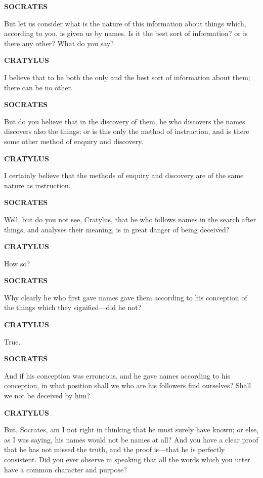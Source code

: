 \documentclass[11pt,letter]{article}
\begin{document}
\par \textbf{SOCRATES}
\par   But let us consider what is the nature of this information about things which, according to you, is given us by names. Is it the best sort of information? or is there any other? What do you say?

\par \textbf{CRATYLUS}
\par   I believe that to be both the only and the best sort of information about them; there can be no other.

\par \textbf{SOCRATES}
\par   But do you believe that in the discovery of them, he who discovers the names discovers also the things; or is this only the method of instruction, and is there some other method of enquiry and discovery.

\par \textbf{CRATYLUS}
\par   I certainly believe that the methods of enquiry and discovery are of the same nature as instruction.

\par \textbf{SOCRATES}
\par   Well, but do you not see, Cratylus, that he who follows names in the search after things, and analyses their meaning, is in great danger of being deceived?

\par \textbf{CRATYLUS}
\par   How so?

\par \textbf{SOCRATES}
\par   Why clearly he who first gave names gave them according to his conception of the things which they signified—did he not?

\par \textbf{CRATYLUS}
\par   True.

\par \textbf{SOCRATES}
\par   And if his conception was erroneous, and he gave names according to his conception, in what position shall we who are his followers find ourselves? Shall we not be deceived by him?

\par \textbf{CRATYLUS}
\par   But, Socrates, am I not right in thinking that he must surely have known; or else, as I was saying, his names would not be names at all? And you have a clear proof that he has not missed the truth, and the proof is—that he is perfectly consistent. Did you ever observe in speaking that all the words which you utter have a common character and purpose?
\end{document}
